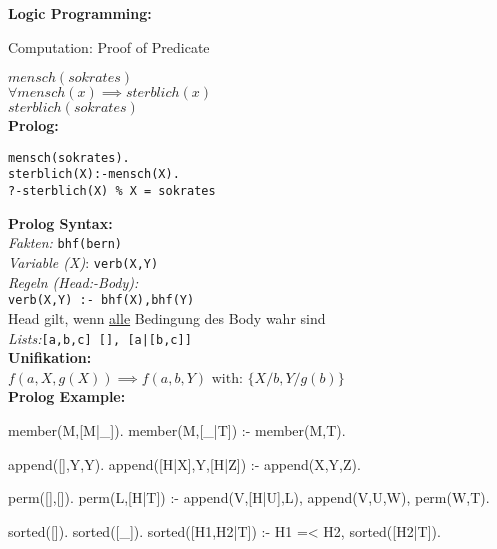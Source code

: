\begin{breakbox}
\textbf{Logic Programming:}
\begin{mdframed}
  \begin{center}
  	Computation: Proof of Predicate 
  \end{center}
\end{mdframed}

$mensch(sokrates)$ \\
$\forall mensch(x) \implies sterblich(x)$ \\
$sterblich(sokrates)$\\

\textbf{Prolog:}
\vspace{-5mm}
\begin{verbatim}
mensch(sokrates).
sterblich(X):-mensch(X).
?-sterblich(X) % X = sokrates
\end{verbatim}
\textbf{Prolog Syntax:}\\
\emph{Fakten:} \texttt{bhf(bern)}\\
\emph{Variable (X)}: \texttt{verb(X,Y)}\\
\emph{Regeln (Head:-Body):}\\ \texttt{verb(X,Y) :- bhf(X),bhf(Y)}\\
Head gilt, wenn \underline{alle} Bedingung des Body wahr sind\\
\emph{Lists:}\texttt{[a,b,c] [], [a|[b,c]]}\\

\textbf{Unifikation:}\\
$f(a,X,g(X)) \implies f(a,b,Y)$ 
$\text{with: } \{X/b, Y/g(b)\}$\\

\textbf{Prolog Example:}\\
\begin{prologcode}

member(M,[M|_]).
member(M,[_|T]) :- member(M,T).

append([],Y,Y).
append([H|X],Y,[H|Z]) :- append(X,Y,Z).

perm([],[]).
perm(L,[H|T]) :- append(V,[H|U],L), append(V,U,W), perm(W,T).


sorted([]).
sorted([_]).
sorted([H1,H2|T]) :- H1 =< H2, sorted([H2|T]).


\end{prologcode}
\end{breakbox}

